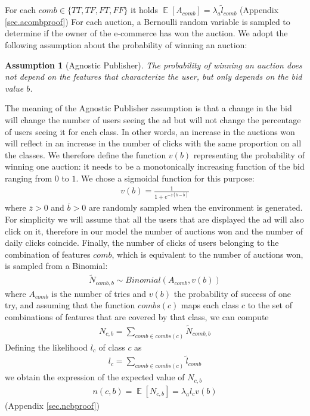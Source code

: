 \documentclass[11pt]{article} %
\DeclareMathOperator{\EX}{\mathbb{E}}
\newtheorem*{assumption}{Assumption}
\begin{document}
For each $comb \in \{TT,TF,FT,FF\}$ it holds $\EX[A_{comb}] = \lambda_a \tilde{l}_{comb}$ (Appendix \ref{sec.acombproof})
\newline
\newline
For each auction, a Bernoulli random variable is sampled to determine if the owner of the e-commerce has won the auction. We adopt the following assumption about the probability of winning an auction:
\begin{assumption}[Agnostic Publisher] The probability of winning an auction does not depend on the features that characterize the user, but only depends on the bid value $b$.
\end{assumption}
The meaning of the Agnostic Publisher assumption is that a change in the bid will change the number of users seeing the ad but will not change the percentage of users seeing it for each class. In other words, an increase in the auctions won will reflect in an increase in the number of clicks with the same proportion on all the classes.
\newline
\newline
We therefore define the function $v(b)$ representing the probability of winning one auction: it needs to be a monotonically increasing function of the bid ranging from $0$ to $1$. We chose a sigmoidal function for this purpose:
\begin{align*}
v(b)=\frac{1}{1+e^{-\overline z(b-\overline b)}}
\end{align*}
where $\overline z > 0$ and $\overline b > 0$ are randomly sampled when the environment is generated.
\newline
\newline
For simplicity we will assume that all the users that are displayed the ad will also click on it, therefore in our model the number of auctions won and the number of daily clicks coincide.
\newline
\newline
Finally, the number of clicks of users belonging to the combination of features $comb$, which is equivalent to the number of auctions won, is sampled from a Binomial:
\begin{align*}
\tilde{N}_{comb,b} \sim Binomial(A_{comb}, v(b))
\end{align*}
where $A_{comb}$ is the number of tries and $v(b)$ the probability of success of one try, and assuming that the function $combs(c)$ maps each class $c$ to the set of combinations of features that are covered by that class, we can compute
\begin{align*}
N_{c,b} = \sum_{comb \in combs(c)}{\tilde{N}_{comb,b}}
\end{align*}
Defining the likelihood $l_c$ of class $c$ as 
\begin{align*}
l_c = \sum_{comb \in combs(c)}{\tilde{l}_{comb}}
\end{align*}
we obtain the expression of the expected value of $N_{c,b}$ 
\begin{align*}
n(c,b) = \EX[N_{c,b}] =\lambda_al_{c}v(b)
\end{align*}
 (Appendix \ref{sec.ncbproof})
\end{document}
